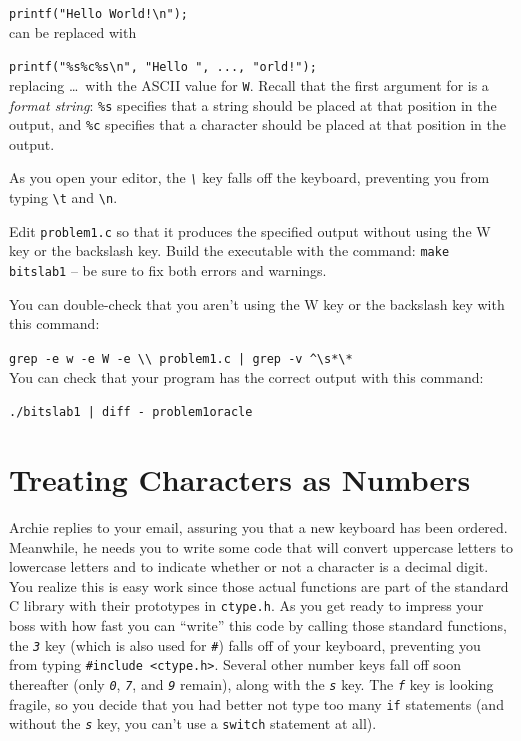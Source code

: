 \lstinline{printf("Hello World!\n");} \\
can be replaced with

\lstinline{printf("%s%c%s\n", "Hello ", ..., "orld!");} \\
replacing \dots\ with the ASCII value for \texttt{W}. Recall that the first
argument for  is a \textit{format string}: \texttt{\%s}
specifies that a string should be placed at that position in the output, and
\texttt{\%c} specifies that a character should be placed at that position in
the output.

As you open your editor, the \textit{\texttt{\textbackslash}} key falls off the
keyboard, preventing you from typing \texttt{\textbackslash t} and
\texttt{\textbackslash n}.

Edit \texttt{problem1.c} so that it produces the specified output without using
the W key or the backslash key. Build the executable with the command:
\texttt{make bitslab1} -- be sure to fix both errors and warnings.

You can double-check that you aren't using the W key or the backslash key with
this command:

\texttt{grep -e w -e W -e
\textquotesingle\textbackslash\textbackslash\textquotesingle\ problem1.c | grep
-v \textquotesingle{}\^{}\textbackslash{}s*\textbackslash{}*\textquotesingle} \\
You can check that your program has the correct output with this command:

\texttt{./bitslab1 | diff - problem1oracle}


\section{Treating Characters as Numbers}

Archie replies to your email, assuring you that a new keyboard has been
ordered. Meanwhile, he needs you to write some code that will convert uppercase
letters to lowercase letters and to indicate whether or not a character is a
decimal digit. You realize this is easy work since those actual functions are
part of the standard C library with their prototypes in \texttt{ctype.h}. As
you get ready to impress your boss with how fast you can ``write'' this code by
calling those standard functions, the \textit{\texttt{3}} key (which is also
used for \textit{\texttt{\#}}) falls off of your keyboard, preventing you from
typing \lstinline{#include <ctype.h>}. Several other number keys fall off soon
thereafter (only \textit{\texttt{0}}, \textit{\texttt{7}}, and
\textit{\texttt{9}} remain), along with the \textit{\texttt{s}} key. The
\textit{\texttt{f}} key is looking fragile, so you decide that you had better
not type too many \lstinline{if} statements (and without the
\textit{\texttt{s}} key, you can't use a \lstinline{switch} statement at all).

